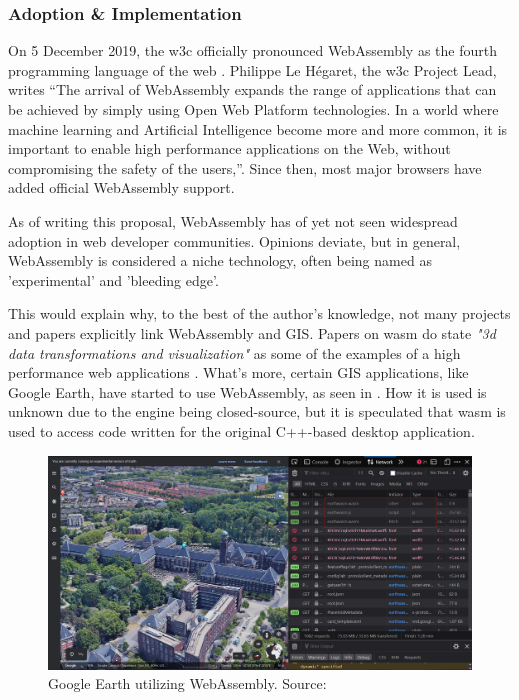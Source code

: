 \subsubsection*{Adoption \& Implementation}

On 5 December 2019, the \ac{w3c} officially pronounced WebAssembly as the fourth programming language of the web \cite{w3c_world_2019}. Philippe Le Hégaret, the \ac{w3c} Project Lead, writes “The arrival of WebAssembly expands the range of applications that can be achieved by simply using Open Web Platform technologies. In a world where machine learning and Artificial Intelligence become more and more common, it is important to enable high performance applications on the Web, without compromising the safety of the users,”. Since then, most major browsers have added official WebAssembly support.

As of writing this proposal, WebAssembly has of yet not seen widespread adoption in web developer communities. Opinions deviate, but in general, WebAssembly is considered a niche technology, often being named as 'experimental' and 'bleeding edge'. 

This would explain why, to the best of the author's knowledge, not many projects and papers explicitly link WebAssembly and GIS. Papers on \ac{wasm} do state \textit{"3d data transformations and visualization"} as some of the examples of a high performance web applications \cite{haas_bringing_2017, jangda_not_2019}. What's more, certain GIS applications, like Google Earth, have started to use WebAssembly, as seen in  \cite{google_google_2020}. How it is used is unknown due to the engine being closed-source, but it is speculated that \ac{wasm} is used to access code written for the original C++-based desktop application.

\begin{figure}[!tbp]
  \centering
  \begin{minipage}[b]{0.80\textwidth}
    \includegraphics[width=\textwidth]{../images/google-earth-uses-webassembly.PNG}
    \caption{Google Earth utilizing WebAssembly. Source: \cite{google_google_2020}}
    \label{fig:google-earth}
  \end{minipage}
\end{figure}

